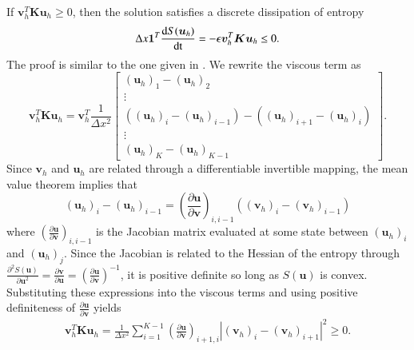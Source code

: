 \documentclass[preprint,10pt]{elsarticle}
\theoremstyle{definition}
\theoremstyle{lemma}
\theoremstyle{theorem}
\theoremstyle{assumption}
\newcommand{\td}[2]{\frac{{\rm d}#1}{{\rm d}{\rm #2}}}
\newcommand{\pd}[2]{\frac{\partial#1}{\partial#2}}
\newcommand{\LRp}[1]{\left( #1 \right)}
\newcommand{\LRb}[1]{\left| #1 \right|}
\newcommand{\pdn}[3]{\frac{\partial^{#3}#1}{\partial#2^{#3}}}
\begin{document}
If $\bm{v}_h^T\bm{K}\bm{u}_h \geq 0$, then the solution satisfies a discrete dissipation of entropy
\begin{equation}
\Delta x \bm{1}^T\td{S(\bm{u}_h)}{t} = -\epsilon\bm{v}_h^T\bm{K}\bm{u}_h \leq 0.
\label{eq:entropybalancefom}
\end{equation}
The proof is similar to the one given in \cite{tadmor2006entropy}.  We rewrite the viscous term as
\[
\bm{v}_h^T\bm{K}\bm{u}_h = \bm{v}_h^T \frac{1}{\Delta x^2}\begin{bmatrix}
\LRp{\bm{u}_h}_1 - \LRp{\bm{u}_h}_2\\ 
\vdots\\
\LRp{\LRp{\bm{u}_h}_i - \LRp{\bm{u}_h}_{i-1}} - \LRp{\LRp{\bm{u}_h}_{i+1} - \LRp{\bm{u}_h}_{i}}\\
\vdots\\
\LRp{\bm{u}_h}_K- \LRp{\bm{u}_h}_{K-1} 
\end{bmatrix}.
\]
Since $\bm{v}_h$ and $\bm{u}_h$ are related through a differentiable invertible mapping, the mean value theorem implies that
\[
\LRp{\bm{u}_h}_i - \LRp{\bm{u}_h}_{i-1} = \LRp{\pd{\bm{u}}{\bm{v}}}_{i,i-1} \LRp{\LRp{\bm{v}_h}_i - \LRp{\bm{v}_h}_{i-1}}
\]
where $\LRp{\pd{\bm{u}}{\bm{v}}}_{i,i-1}$ is the Jacobian matrix evaluated at some state between $(\bm{u}_h)_i$ and $(\bm{u}_h)_j$.  Since the Jacobian is related to the Hessian of the entropy through $\pdn{S(\bm{u})}{\bm{u}}{2} = \pd{\bm{v}}{\bm{u}} = \LRp{\pd{\bm{u}}{\bm{v}}}^{-1}$, it is positive definite so long as $S(\bm{u})$ is convex.  Substituting these expressions into the viscous terms and using positive definiteness of $\pd{\bm{u}}{\bm{v}}$  yields 
\begin{gather}
\bm{v}_h^T\bm{K}\bm{u}_h = 
 \frac{1}{\Delta x^2}\sum_{i=1}^{K-1} \LRp{\pd{\bm{u}}{\bm{v}}}_{i+1,i} \LRb{\LRp{\bm{v}_h}_{i} - \LRp{\bm{v}_h}_{i+1}}^2 \geq 0.
 \label{eq:entropydissfom}
\end{gather}
\end{document}
